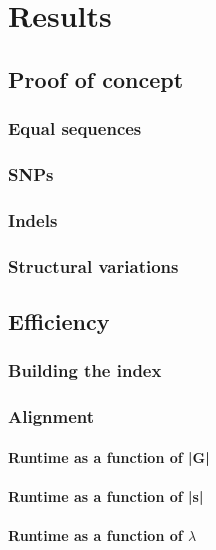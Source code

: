 \documentclass[thesis.tex]{subfiles}
\begin{document}
\chapter{Results}
\section{Proof of concept}
\subsection{Equal sequences}
\subsection{SNPs}
\subsection{Indels}
\subsection{Structural variations}
\section{Efficiency}
\subsection{Building the index}
\subsection{Alignment}
\subsubsection{Runtime as a function of |G|}
\subsubsection{Runtime as a function of |s|}
\subsubsection{Runtime as a function of $\lambda$}
\end{document}
